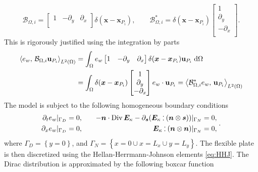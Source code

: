 \begin{equation*}
\mathcal{B}_{\Omega, i} =
\begin{bmatrix}
1 & -\partial_y & \partial_x \\
\end{bmatrix} \delta(\bm{x} - \bm{x}_{P_i}), \qquad 
\mathcal{B}_{\Omega, i}^* = \delta(\bm{x} - \bm{x}_{P_i}) \begin{bmatrix}
1 \\
\partial_y \\
-\partial_x \\
\end{bmatrix}.
\end{equation*} 
This is rigorously justified using the integration by parts
\begin{equation}
\begin{aligned}
\inner[L^2(\Omega)]{e_w}{\mathcal{B}_{\Omega, i} \mathbf{u}_{P_i}} &= \int_\Omega e_w \begin{bmatrix}
1 & -\partial_y & \partial_x \\
\end{bmatrix} \delta(\bm{x} - \bm{x}_{P_i}) \mathbf{u}_{P_i} \d\Omega \\
& = \int_\Omega \delta(\bm{x} - \bm{x}_{P_i})\begin{bmatrix}
1 \\
\partial_y \\
-\partial_x \\
\end{bmatrix} e_w \cdot \mathbf{u}_{P_i} = \inner[L^2(\Omega)]{\mathcal{B}_{\Omega, i}^* e_w}{\mathbf{u}_{P_i}}
\end{aligned}
\end{equation}
The model is subject to the following homogeneous boundary conditions
\begin{align*}
\begin{aligned}
\partial_t e_w|_{\Gamma_D} &= 0, \\
\partial_x e_w|_{\Gamma_D} &= 0, \\
\end{aligned} \qquad 
\begin{aligned}
-\bm{n} \cdot \Div \bm{E}_\kappa - \partial_{\bm{s}} (\bm{E}_\kappa \cddot (\bm{n} \otimes \bm{s}))|_{\Gamma_N}&=0,\\
\bm{E}_\kappa \cddot (\bm{n}\otimes \bm{n})|_{\Gamma_N}&=0, \; \\
\end{aligned} .
\end{align*}
where ${\Gamma_D} = \left\{y = 0 \right\}$, and ${\Gamma_N} = \left\{x = 0 \cup x=L_x \cup y=L_y \right\}$. The flexible plate is then discretized using the Hellan-Herrmann-Johnson elements \ref{eq:HHJ}. The Dirac distribution is approximated by the following boxcar function

